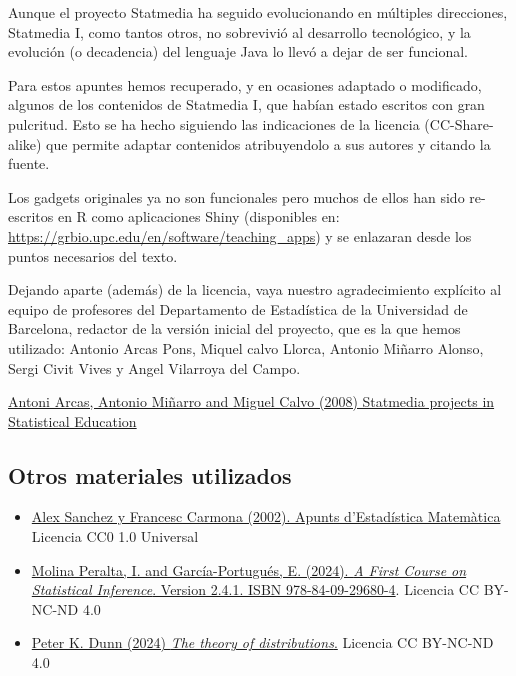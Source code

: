 \documentclass[
]{article}
\begin{document}
Aunque el proyecto Statmedia ha seguido evolucionando en múltiples direcciones, Statmedia I, como tantos otros, no sobrevivió al desarrollo tecnológico, y la evolución (o decadencia) del lenguaje Java lo llevó a dejar de ser funcional.

Para estos apuntes hemos recuperado, y en ocasiones adaptado o modificado, algunos de los contenidos de Statmedia I, que habían estado escritos con gran pulcritud. Esto se ha hecho siguiendo las indicaciones de la licencia (CC-Share-alike) que permite adaptar contenidos atribuyendolo a sus autores y citando la fuente.

Los gadgets originales ya no son funcionales pero muchos de ellos han sido re-escritos en R como aplicaciones Shiny (disponibles en: \url{https://grbio.upc.edu/en/software/teaching_apps}) y se enlazaran desde los puntos necesarios del texto.

Dejando aparte (además) de la licencia, vaya nuestro agradecimiento explícito al equipo de profesores del Departamento de Estadística de la Universidad de Barcelona, redactor de la versión inicial del proyecto, que es la que hemos utilizado: Antonio Arcas Pons, Miquel calvo Llorca, Antonio Miñarro Alonso, Sergi Civit Vives y Angel Vilarroya del Campo.

\href{https://www.emis.de/journals/BEIO/files/BEIOv25n1_HE_A.Arcas+A.Minarro+M.Calvo.pdf}{Antoni Arcas, Antonio Miñarro and Miguel Calvo (2008) Statmedia projects in Statistical Education}

\subsection*{Otros materiales utilizados}\label{otros-materiales-utilizados}

\begin{itemize}
\item
  \href{https://github.com/ASPteaching/ApuntsEstadisticaMatematica}{Alex Sanchez y Francesc Carmona (2002). Apunts d'Estadística Matemàtica} Licencia CC0 1.0 Universal
\item
  \href{https://bookdown.org/egarpor/inference/}{Molina Peralta, I. and García-Portugués, E. (2024). \emph{A First Course on Statistical Inference}. Version 2.4.1. ISBN 978-84-09-29680-4}. Licencia CC BY-NC-ND 4.0
\item
  \href{https://bookdown.org/pkaldunn/DistTheory}{Peter K. Dunn (2024) \emph{The theory of distributions}.} Licencia CC BY-NC-ND 4.0
\end{itemize}
\end{document}
